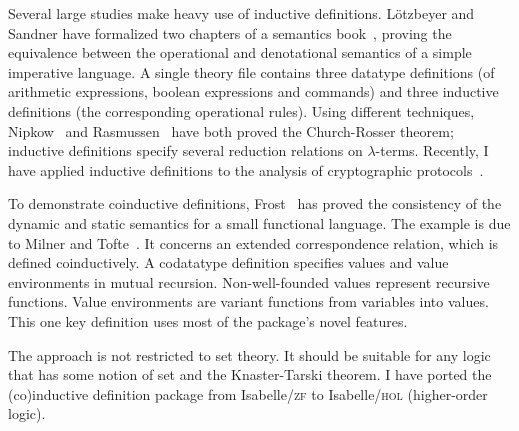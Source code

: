 \documentclass[12pt]{article}
\begin{document}
Several large studies make heavy use of inductive definitions.  L\"otzbeyer
and Sandner have formalized two chapters of a semantics book~\cite{winskel93},
proving the equivalence between the operational and denotational semantics of
a simple imperative language.  A single theory file contains three datatype
definitions (of arithmetic expressions, boolean expressions and commands) and
three inductive definitions (the corresponding operational rules).  Using
different techniques, Nipkow~\cite{nipkow-CR} and Rasmussen~\cite{rasmussen95}
have both proved the Church-Rosser theorem; inductive definitions specify
several reduction relations on $\lambda$-terms.  Recently, I have applied
inductive definitions to the analysis of cryptographic
protocols~\cite{paulson-markt}. 

To demonstrate coinductive definitions, Frost~\cite{frost95} has proved the
consistency of the dynamic and static semantics for a small functional
language.  The example is due to Milner and Tofte~\cite{milner-coind}.  It
concerns an extended correspondence relation, which is defined coinductively.
A codatatype definition specifies values and value environments in mutual
recursion.  Non-well-founded values represent recursive functions.  Value
environments are variant functions from variables into values.  This one key
definition uses most of the package's novel features.

The approach is not restricted to set theory.  It should be suitable for any
logic that has some notion of set and the Knaster-Tarski theorem.  I have
ported the (co)inductive definition package from Isabelle/\textsc{zf} to
Isabelle/\textsc{hol} (higher-order logic).  


\begin{footnotesize}


\end{footnotesize}
\end{document}
